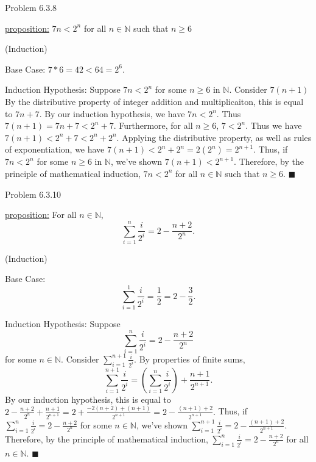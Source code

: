 \documentclass{article}
\theoremstyle{definition}
\newcommand{\N}{\mathbb{N}}
\begin{document}
	\noindent Problem 6.3.8  \vspace{0.3cm}

	\underline{proposition:} $7n<2^n$ for all $n\in \N$ such that $n\ge 6$

	\vspace{0.2cm}

	 (Induction)

	Base Case: $7*6=42<64=2^6$.

	Induction Hypothesis: Suppose $7n<2^n$ for some $n\ge 6$  in $\N$. Consider $7(n+1)$  By the distributive property of integer addition and multiplicaiton, this is equal to $7n+7$. By our induction hypothesis, we have $7n<2^n$. Thus $7(n+1)=7n+7<2^n+7$. Furthermore, for all $n\ge 6$, $7<2^n$. Thus we have $7(n+1)<2^n+7<2^n+2^n$. Applying the distributive property, as well as rules of exponentiation, we have $7(n+1)<2^n+2^n=2(2^n)=2^{n+1}.$  Thus, if $7n<2^n$ for some $n\ge 6$ in $\N$, we've shown $7(n+1)<2^{n+1}$. Therefore, by the principle of mathematical induction, $7n<2^n$ for all $n\in \N$ such that $n\ge 6.$  $\blacksquare$
	\vspace{1cm}

	\noindent Problem 6.3.10  \vspace{0.3cm}

	\underline{proposition:} For all $n\in \N$,  $$\sum_{i=1}^n\frac{i}{2^i}=2-\frac{n+2}{2^n}.$$
	\vspace{0.2cm}

	 (Induction)

	Base Case: $$\sum_{i=1}^1\frac{i}{2^i}=\frac{1}{2}=2-\frac{3}{2}.$$

	Induction Hypothesis: Suppose $$\sum_{i=1}^n\frac{i}{2^i}=2-\frac{n+2}{2^n}$$ for some $n\in \N.$ Consider $\sum_{i=1}^{n+1}\frac{i}{2^i}$. By properties of finite sums, $$\sum_{i=1}^{n+1}\frac{i}{2^i}=(\sum_{i=1}^n\frac{i}{2^i})+\frac{n+1}{2^{n+1}}.$$  By our induction hypothesis, this is equal to $2-\frac{n+2}{2^n}+\frac{n+1}{2^{n+1}}=2+\frac{-2(n+2)+(n+1)}{2^{n+1}}=2-\frac{(n+1)+2}{2^{n+1}}.$  Thus, if $\sum_{i=1}^n\frac{i}{2^i}=2-\frac{n+2}{2^n}$ for some $n\in\N$, we've shown $\sum_{i=1}^{n+1}\frac{i}{2^i}=2-\frac{(n+1)+2}{2^{n+1}}$. Therefore, by the principle of mathematical induction, $\sum_{i=1}^n\frac{i}{2^i}=2-\frac{n+2}{2^n}$ for all $n\in\N.$  $\blacksquare$
	\vspace{1cm}


\end{document}
